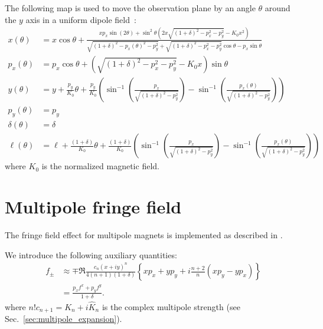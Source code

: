 The following map is used to move the observation plane by an angle $\theta$
around the $y$ axis in a uniform dipole field~\cite{forest99}:
\begin{align}
x(\theta) &= x \cos\theta
+ \frac{ x p_x \sin(2\theta) + \sin^2\theta \left( 2x \sqrt{(1+\delta)^2 - p_x^2 - p_y^2} - K_0 x^2 \right) }
{\sqrt{(1+\delta)^2 - p_x(\theta)^2 - p_y^2} + \sqrt{(1+\delta)^2 - p_x^2 - p_y^2} \cos\theta - p_x \sin\theta}
\\[1ex]
p_x(\theta) &= p_x \cos\theta + \left( \sqrt{(1+\delta)^2 - p_x^2 - p_y^2} - K_0 x \right) \sin\theta
\\[1ex]
y(\theta) &= y + \frac{p_y}{K_0} \theta
+ \frac{p_y}{K_0} \left(
\sin^{-1}\!\left( \frac{p_x}{\sqrt{(1+\delta)^2 - p_y^2}} \right)
- \sin^{-1}\!\left( \frac{p_x(\theta)}{\sqrt{(1+\delta)^2 - p_y^2}} \right)
\right)
\\[1ex]
p_y(\theta) &= p_y
\\[1ex]
\delta(\theta) &= \delta
\\[1ex]
\ell(\theta) &= \ell + \frac{(1+\delta)}{K_0} \theta
+ \frac{(1+\delta)}{K_0} \left(
\sin^{-1}\!\left( \frac{p_x}{\sqrt{(1+\delta)^2 - p_y^2}} \right)
- \sin^{-1}\!\left( \frac{p_x(\theta)}{\sqrt{(1+\delta)^2 - p_y^2}} \right)
\right)
\end{align}
%
where $K_0$ is the normalized magnetic field.

\section{Multipole fringe field}

The fringe field effect for multipole magnets is implemented as described in
\cite{forest99}.

We introduce the following auxiliary quantities:
\begin{align}
f_\pm &\approx
\mp \Re \frac{c_n (x + i y)^n}{4 (n+1)(1+\delta)}
\left\{ x p_x + y p_y + i \frac{n+2}{n} (x p_y - y p_x) \right\}
\label{eq:fpm}
\\[1ex]
&= \frac{p_x f^x + p_y f^y}{1+\delta}.
\nonumber
\end{align}
where $n! c_{n+1} = K_n + i \hat{K}_n$ is the complex multipole strength (see Sec.~\ref{sec:multipole_expansion}).

